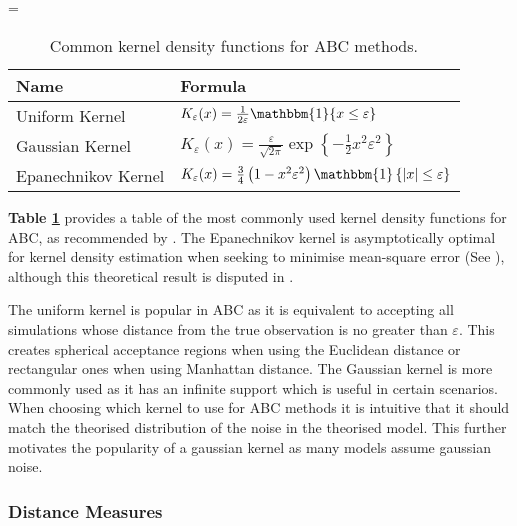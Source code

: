 \documentclass[11pt,a4paper]{article}
\theoremstyle{break}
\begin{document}
  \begin{table}
    \everymath={\displaystyle}
    \centering
    \begin{tabular}{|l|l|}
      \hline
      \textbf{Name}&\textbf{Formula}\\\hline
      Uniform Kernel&$K_\varepsilon(x)=\frac1{2\varepsilon}\mathbbm{1}\{x\leq\varepsilon\}$\\\hline
      Gaussian Kernel&$K_\varepsilon(x)=\frac\varepsilon{\sqrt{2\pi}}\exp\left\{-\frac12x^2\varepsilon^2\right\}$\\\hline
      Epanechnikov Kernel&$K_\varepsilon(x)=\frac34\left(1-x^2\varepsilon^2\right)\mathbbm{1}\left\{|x|\leq\varepsilon\right\}$\\
      \hline
    \end{tabular}
    \caption{Common kernel density functions for ABC methods.\protect\footnotemark}
    \label{tab_common_kernels}
  \end{table}

  \par \textbf{Table \ref{tab_common_kernels}} provides a table of the most commonly used kernel density functions for ABC, as recommended by \cite[]{annual_review_of_statistics_ABC}. The Epanechnikov kernel is asymptotically optimal for kernel density estimation when seeking to minimise mean-square error (See \cite[]{non_parameteric_estimation_of_a_multivariate_probability_density}), although this theoretical result is disputed in \cite[]{introduction_to_nonparametric_estimation}.

  \par The uniform kernel is popular in ABC as it is equivalent to accepting all simulations whose distance from the true observation is no greater than $\varepsilon$. This creates spherical acceptance regions when using the Euclidean distance or rectangular ones when using Manhattan distance. The Gaussian kernel is more commonly used as it has an infinite support which is useful in certain scenarios. When choosing which kernel to use for ABC methods it is intuitive that it should match the theorised distribution of the noise in the theorised model. This further motivates the popularity of a gaussian kernel as many models assume gaussian noise.

\subsubsection*{Distance Measures}\label{sec_distance_measures}
\end{document}
